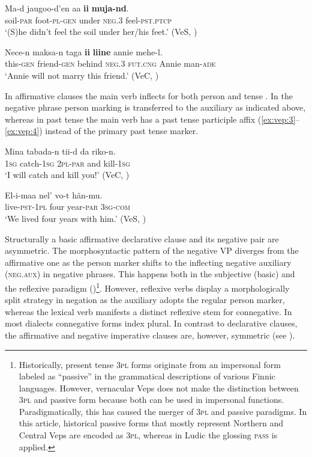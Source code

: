 \documentclass[output=paper,colorlinks=true, citecolor=brown]{langscibook}
\begin{document}
\ea
    \label{ex:vep:4}
    \gll Ma-d  jaugoo-d’en aa \textbf{ii} \textbf{muja-nd}. \\
         soil-\textsc{par} foot{}-\textsc{pl{}-gen} under \textsc{neg.3} feel-\textsc{pst.ptcp} \\
    \glt ‘(S)he didn’t feel the soil under her/his feet.’ (VeS, \citealt[83]{Kettunen1920})
\z

\ea
    \label{ex:vep:5}
    \gll Nece-n maksa-n taga \textbf{ii} \textbf{liine} annie  mehe-l. \\
         this\textsc{{}-gen} friend\textsc{{}-gen} behind \textsc{neg.3} \textsc{fut}.\textsc{cng} Annie man-\textsc{ade}\\
    \glt ‘Annie will not marry this friend.’ (VeC, \citealt[166]{MSFOu70})
\z 

    
In affirmative clauses the main verb inflects for both person  and tense . In the negative phrase person marking is transferred to the auxiliary as indicated above, whereas in past tense the main verb has a past tense participle affix (\ref{ex:vep:3}--\ref{ex:vep:4}) instead of the primary past tense marker.

\ea\label{ex:vep:6}
    \gll Mina tabada-n tii-d da riko-n. \\
          \textsc{1sg} catch-\textsc{1sg} \textsc{2pl}-\textsc{par} and kill-\textsc{1sg}\\
    \glt ‘I will catch and kill you!’ (VeC, \citealt[39]{MSFOu70})
\z 

\ea
    \label{ex:vep:7}
    \gll El-i-maa  nel’ vo-t hän-mu.\\
          live-\textsc{pst-1pl} four year-\textsc{par} \textsc{3sg-com}\\
    \glt ‘We lived four years with him.’ (VeS, \citealt[5]{MSFOu70})
\z 

Structurally a basic affirmative declarative clause and its negative pair are asymmetric. The morphosyntactic pattern of the negative VP diverges from the affirmative one as the person marker shifts to the inflecting negative auxiliary (\textsc{neg}.\textsc{aux}) in negative phrases. This happens both in the subjective (basic) and the reflexive paradigm ()\footnote{Historically, present tense \textsc{3pl} forms originate from an impersonal form labeled as “passive” in the grammatical descriptions of various Finnic languages. However, vernacular Veps does not make the distinction between \textsc{3pl} and passive form because both can be used in impersonal functions. Paradigmatically, this has caused the merger of \textsc{3pl} and passive paradigms. In this article, historical passive forms that mostly represent Northern and Central Veps are encoded as \textsc{3pl}, whereas in Ludic the glossing \textsc{pa}\textsc{ss} is applied.}.  However, reflexive verbs display a morphologically split strategy in negation as the auxiliary adopts the regular person marker, whereas the lexical verb manifests a distinct reflexive stem for connegative. In most dialects connegative forms index plural. In contrast to declarative clauses, the affirmative and negative imperative clauses are, however, symmetric (see ).
\end{document}
